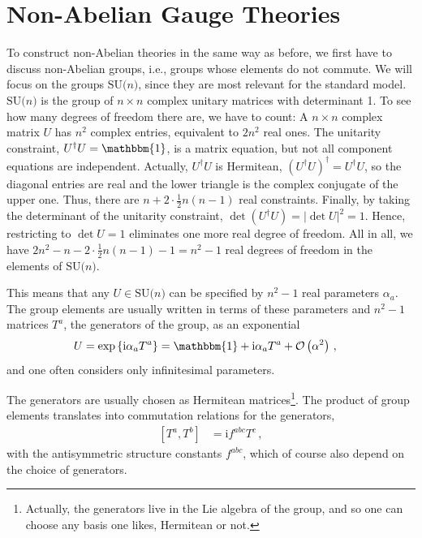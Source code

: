 \documentclass[12pt]{report}
\newcommand{\sun}{\ensuremath{\mathrm{SU(}n\mathrm{)}}}
\renewcommand{\i}{\ensuremath{\text{i}}}
\newcommand{\2}{\ensuremath{\sqrt{2}\,}}
\begin{document}
{        
    \section{Non-Abelian Gauge Theories}
      To construct non-Abelian theories in the same way as before, we first have to discuss
      non-Abelian groups, i.e., groups whose elements do not commute. We will focus on the groups
      $\sun$, since they are  
      most relevant for the standard model. $\sun$ is the group of $n\times n$ complex unitary
      matrices with determinant 1. To see how many degrees of freedom there are, we have to count: A
      $n\times n$ complex matrix $U$ has $n^2$ complex entries, equivalent to  $2n^2$ real
      ones. The unitarity constraint, $U^\dagger U=\mathbbm{1}$, is a matrix equation, but not all
      component equations are independent. Actually, $U^\dagger U$  is Hermitean, $\left(U^\dagger
        U\right)^\dagger=U^\dagger U$, so the diagonal entries are real and the 
      lower triangle is the complex conjugate of the upper one. Thus, there are $n +2\cdot\frac{1}{2}
      n (n-1)$ real constraints.  Finally, by taking the determinant of the unitarity constraint,
      $\det \left(U^\dagger U\right)=\left|\det U\right|^2 =1$. Hence, restricting to $\det U=1$ eliminates
      one more real degree of freedom. All in all, we have $2 n^2 - n -2\cdot\frac{1}{2}n (n-1)
      -1=n^2-1$ real degrees of freedom in the elements of $\sun$.
        
      This means that any $U\in\sun$ can be specified by $n^2-1$ real parameters
      $\alpha_a$. The group elements are usually written in terms of these parameters and $n^2-1$
      matrices $T^a$, the generators of the group, as an exponential
      \begin{align}
        U & = \exp\left\{\i \alpha_a T^a\right\}= \mathbbm{1} + \i \alpha_a T^a
        +\mathcal{O}\left(\alpha^2\right) \,, 
      \end{align}
      and one often considers only infinitesimal parameters.
      
      The generators are usually chosen as Hermitean matrices\footnote{Actually, the generators
        live in the Lie algebra of the group, and so one can choose any basis one likes, Hermitean
        or not.}.  The product of group elements translates into commutation relations for the
      generators, 
      \begin{align}
        \left[T^a,T^b\right]&=\i f^{abc}  T^c\,,
      \end{align}
      with the antisymmetric structure constants $f^{abc}$, which of
      course also depend on the choice of generators.

}
\end{document}

